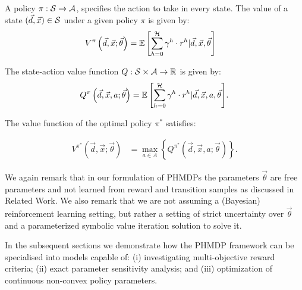 A policy {\footnotesize $\pi : \mathcal{S} \rightarrow \mathcal{A}$}, specifies
the action to take in every state. The value of a state {\footnotesize
  $(\vec{d}, \vec{x}) \in \mathcal{S}$} under a given policy
{\footnotesize$\pi$} is given by: {\footnotesize
    \abovedisplayskip=0pt
    \belowdisplayskip=0pt
\begin{align*}
    V^{\pi}\left( \vec{d}, \vec{x}; \vec{\theta} \right) &= {\mathbb{E}\left[{\sum\limits_{h = 0}^{\mathcal{H}} \gamma^h \cdot r^h | \vec{d}, \vec{x}, \vec{\theta}}\right]} \nonumber  
\end{align*}
}

The state-action value function {\footnotesize$Q : \mathcal{S} \times \mathcal{A} \rightarrow \mathbb{R}$} is given by:
{\footnotesize 
    \abovedisplayskip=0pt
    \belowdisplayskip=0pt
\begin{align}
    \label{eq:mdp_qfunc}
    Q^{\pi}\left(\vec{d}, \vec{x}, a; \vec{\theta}\right) = {\mathbb{E}\left[{\sum\limits_{h = 0}^{\mathcal{H}} \gamma^h \cdot r^h | \vec{d}, \vec{x}, a, \vec{\theta}}\right]}. 
\end{align}
}

The value function of the optimal policy {\footnotesize$ \pi^{*} $} satisfies:

{\footnotesize 
\abovedisplayskip=0pt
\belowdisplayskip=0pt
\begin{align}
    \label{eq:opt_vfunc}
    V^{\pi^{*}}\left(\vec{d}, \vec{x}; \vec{\theta}\right) &= \max_{a \in A} \left\{ Q^{\pi^{*}}\left(\vec{d}, \vec{x}, a; \vec{\theta}\right) \right\}. 
\end{align}
}%

We again remark that in our formulation of PHMDPs the
parameters {\footnotesize $ \vec{\theta} $} are free parameters and not
learned from reward and transition samples as discussed in Related Work.
We also remark that we are not assuming a (Bayesian) reinforcement learning setting,
but rather a setting of strict uncertainty over {\footnotesize $ \vec{\theta} $} and
a parameterized symbolic value iteration solution to solve it.

In the subsequent sections we demonstrate how the PHMDP framework can
be specialised into models capable of: (i) investigating
multi-objective reward criteria; (ii) exact parameter sensitivity
analysis; and (iii) optimization of continuous non-convex policy
parameters.

